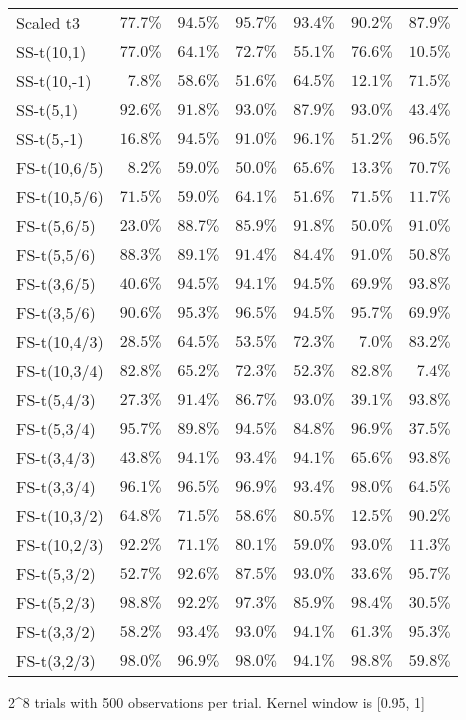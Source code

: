 \begin{longtable}{lrrrrrr}
Scaled t3 & $77.7\%$ & $94.5\%$ & $95.7\%$ & $93.4\%$ & $90.2\%$ & $87.9\%$ \\ 
SS-t(10,1) & $77.0\%$ & $64.1\%$ & $72.7\%$ & $55.1\%$ & $76.6\%$ & $10.5\%$ \\ 
SS-t(10,-1) & $7.8\%$ & $58.6\%$ & $51.6\%$ & $64.5\%$ & $12.1\%$ & $71.5\%$ \\ 
SS-t(5,1) & $92.6\%$ & $91.8\%$ & $93.0\%$ & $87.9\%$ & $93.0\%$ & $43.4\%$ \\ 
SS-t(5,-1) & $16.8\%$ & $94.5\%$ & $91.0\%$ & $96.1\%$ & $51.2\%$ & $96.5\%$ \\ 
FS-t(10,6/5) & $8.2\%$ & $59.0\%$ & $50.0\%$ & $65.6\%$ & $13.3\%$ & $70.7\%$ \\ 
FS-t(10,5/6) & $71.5\%$ & $59.0\%$ & $64.1\%$ & $51.6\%$ & $71.5\%$ & $11.7\%$ \\ 
FS-t(5,6/5) & $23.0\%$ & $88.7\%$ & $85.9\%$ & $91.8\%$ & $50.0\%$ & $91.0\%$ \\ 
FS-t(5,5/6) & $88.3\%$ & $89.1\%$ & $91.4\%$ & $84.4\%$ & $91.0\%$ & $50.8\%$ \\ 
FS-t(3,6/5) & $40.6\%$ & $94.5\%$ & $94.1\%$ & $94.5\%$ & $69.9\%$ & $93.8\%$ \\ 
FS-t(3,5/6) & $90.6\%$ & $95.3\%$ & $96.5\%$ & $94.5\%$ & $95.7\%$ & $69.9\%$ \\ 
FS-t(10,4/3) & $28.5\%$ & $64.5\%$ & $53.5\%$ & $72.3\%$ & $7.0\%$ & $83.2\%$ \\ 
FS-t(10,3/4) & $82.8\%$ & $65.2\%$ & $72.3\%$ & $52.3\%$ & $82.8\%$ & $7.4\%$ \\ 
FS-t(5,4/3) & $27.3\%$ & $91.4\%$ & $86.7\%$ & $93.0\%$ & $39.1\%$ & $93.8\%$ \\ 
FS-t(5,3/4) & $95.7\%$ & $89.8\%$ & $94.5\%$ & $84.8\%$ & $96.9\%$ & $37.5\%$ \\ 
FS-t(3,4/3) & $43.8\%$ & $94.1\%$ & $93.4\%$ & $94.1\%$ & $65.6\%$ & $93.8\%$ \\ 
FS-t(3,3/4) & $96.1\%$ & $96.5\%$ & $96.9\%$ & $93.4\%$ & $98.0\%$ & $64.5\%$ \\ 
FS-t(10,3/2) & $64.8\%$ & $71.5\%$ & $58.6\%$ & $80.5\%$ & $12.5\%$ & $90.2\%$ \\ 
FS-t(10,2/3) & $92.2\%$ & $71.1\%$ & $80.1\%$ & $59.0\%$ & $93.0\%$ & $11.3\%$ \\ 
FS-t(5,3/2) & $52.7\%$ & $92.6\%$ & $87.5\%$ & $93.0\%$ & $33.6\%$ & $95.7\%$ \\ 
FS-t(5,2/3) & $98.8\%$ & $92.2\%$ & $97.3\%$ & $85.9\%$ & $98.4\%$ & $30.5\%$ \\ 
FS-t(3,3/2) & $58.2\%$ & $93.4\%$ & $93.0\%$ & $94.1\%$ & $61.3\%$ & $95.3\%$ \\ 
FS-t(3,2/3) & $98.0\%$ & $96.9\%$ & $98.0\%$ & $94.1\%$ & $98.8\%$ & $59.8\%$ \\ 
\bottomrule
\end{longtable}
\begin{minipage}{\linewidth}
2\textasciicircum{}8 trials with 500 observations per trial. Kernel window is [0.95, 1]\\
\end{minipage}

